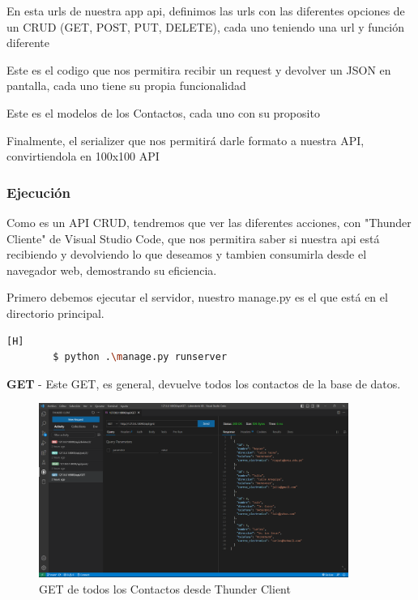 \documentclass{article}
\begin{document}
    En esta urls de nuestra app api, definimos las urls con las diferentes opciones de un CRUD (GET, POST, PUT, DELETE), cada uno teniendo una url y función diferente

    

    Este es el codigo que nos permitira recibir un request y devolver un JSON en pantalla, cada uno tiene su propia funcionalidad

    

    Este es el modelos de los Contactos, cada uno con su proposito

    

    Finalmente, el serializer que nos permitirá darle formato a nuestra API, convirtiendola en 100x100 API

    \subsubsection{Ejecución}
    Como es un API CRUD, tendremos que ver las diferentes acciones, con "Thunder Cliente" de Visual Studio Code, que nos permitira saber si nuestra api está recibiendo y devolviendo lo que deseamos y tambien consumirla desde el navegador web, demostrando su eficiencia.

    Primero debemos ejecutar el servidor, nuestro manage.py es el que está en el directorio principal.
    
    \begin{lstlisting}[language=bash,caption={Abriendo servidor}][H]
		$ python .\manage.py runserver
    \end{lstlisting}

    \textbf{GET} - 
    Este GET, es general, devuelve todos los contactos de la base de datos.
        \begin{figure}[H]
            \centering
            \includegraphics[width=0.9\textwidth,keepaspectratio]{img/DjangoApiRest/get1.png}
            \caption{GET de todos los Contactos desde Thunder Client}
            \label{fig:enter-label}
        \end{figure}
\end{document}
